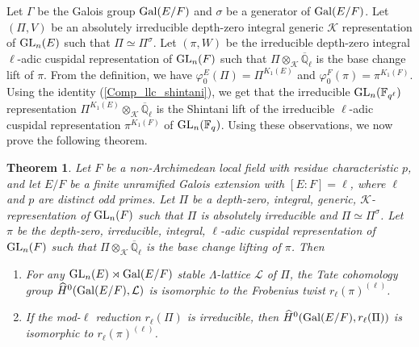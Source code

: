\documentclass[10pt, reqno]{amsart}
\theoremstyle{plain}
\numberwithin{equation}{section} \newcommand{\di}{\operatorname{dim}}
\newtheorem{theorem}{Theorem}[subsection]
\begin{document}
Let $\Gamma$ be the Galois group ${\rm Gal}(E/F)$ and $\sigma$ be a
generator of ${\rm Gal}(E/F)$. Let $(\Pi,V)$ be an absolutely
irreducible depth-zero integral generic $\mathcal{K}$ representation
of ${\rm GL}_n(E)$ such that $\Pi\simeq\Pi^\sigma$. Let $(\pi,W)$ be
the irreducible depth-zero integral $\ell$-adic cuspidal
representation of ${\rm GL}_n(F)$ such that
$\Pi\otimes_{\mathcal{K}}\overline {\mathbb{Q}}_\ell$ is the base
change lift of $\pi$. From the definition, we have
$\varphi_0^E (\Pi) = \Pi^{K_1(E)}$ and
$\varphi_0^F(\pi) = \pi^{K_1(F)}$. Using the identity
(\ref{Comp_llc_shintani}), we get that the irreducible
${\rm GL}_n(\mathbb{F}_{q^\ell})$ representation
$\Pi^{K_1(E)}\otimes_{\mathcal{K}} \overline{\mathbb{Q}}_\ell$ is the
Shintani lift of the irreducible $\ell$-adic cuspidal representation
$\pi^{K_1(F)}$ of ${\rm GL}_n(\mathbb{F}_{q})$. Using these
observations, we now prove the following theorem.
\begin{theorem}
  Let $F$ be a non-Archimedean local field with residue characteristic
  $p$, and let $E/F$ be a finite unramified Galois extension with
  $[E:F]=\ell$, where $\ell$ and $p$ are distinct odd primes. Let
  $\Pi$ be a depth-zero, integral, generic,
  $\mathcal{K}$-representation of ${\rm GL}_n(F)$ such that $\Pi$ is
  absolutely irreducible and $\Pi\simeq \Pi^\sigma$. Let $\pi$ be the
  depth-zero, irreducible, integral, $\ell$-adic cuspidal
  representation of ${\rm GL}_n(F)$ such that
  $\Pi\otimes_{\mathcal{K}} \overline{\mathbb{Q}}_\ell$ is the base
  change lifting of $\pi$. Then
\begin{enumerate}
\item For any ${\rm GL}_n(E)\rtimes {\rm Gal}(E/F)$ stable
  $\Lambda$-lattice $\mathcal{L}$ of $\Pi$, the Tate cohomology group
  $\widehat{H}^0({\rm Gal}(E/F), \mathcal{L})$ is isomorphic to the
  Frobenius twist $r_\ell(\pi)^{(\ell)}$.
\item If the mod-$\ell$ reduction $r_\ell(\Pi)$ is irreducible, then
$\widehat{H}^0({\rm Gal}(E/F), r_\ell(\Pi))$ is isomorphic to $r_\ell(\pi)^{(\ell)}$.
\end{enumerate}
\end{theorem}
\end{document}
